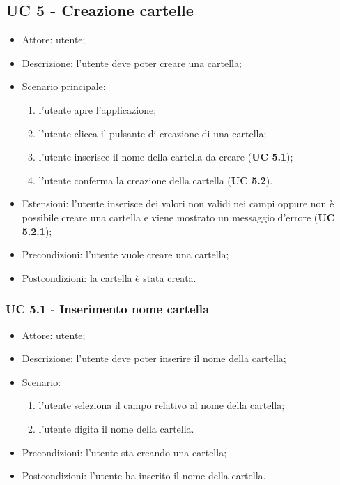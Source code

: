 
    \subsection{UC 5 - Creazione cartelle}
    \begin{itemize}
        \item Attore: utente;
        \item Descrizione: l'utente deve poter creare una cartella;
        \item Scenario principale:
            \begin{enumerate}
            \item l’utente apre l’applicazione;
            \item l’utente clicca il pulsante di creazione di una cartella;
            \item l'utente inserisce il nome della cartella da creare (\textbf{UC 5.1});
            \item l'utente conferma la creazione della cartella (\textbf{UC 5.2}).            
            \end{enumerate}
        \item Estensioni: l'utente inserisce dei valori non validi nei campi oppure non è possibile creare una cartella e viene mostrato un messaggio d'errore (\textbf{UC 5.2.1});
        \item Precondizioni: l'utente vuole creare una cartella;
        \item Postcondizioni: la cartella è stata creata.
    \end{itemize}

    \subsubsection{UC 5.1 - Inserimento nome cartella}
    \begin{itemize}
        \item Attore: utente;
        \item Descrizione: l'utente deve poter inserire il nome della cartella;
        \item Scenario:
        \begin{enumerate}
        \item l'utente seleziona il campo relativo al nome della cartella;
        \item l'utente digita il nome della cartella.
        \end{enumerate}
        \item Precondizioni: l'utente sta creando una cartella;
        \item Postcondizioni: l'utente ha inserito il nome della cartella.
    \end{itemize}
